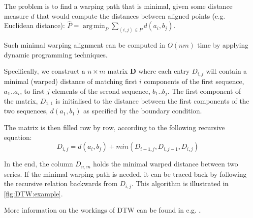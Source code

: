 \documentclass[parskip]{cs4rep}
\DeclareMathOperator*{\argmin}{arg\,min}
\begin{document}
The problem is to find a warping path that is minimal, given some distance measure $d$ that would compute the distances between aligned points (e.g. Euclidean distance): $\hat{P} = \argmin_P \sum_{(i,j) \in P} d(a_i, b_j)$.

Such minimal warping alignment can be computed in $O(nm)$ time by applying dynamic programming techniques. 

Specifically, we construct a $n \times m$ matrix $\mathbf{D}$ where each entry $D_{i,j}$ will contain a minimal (warped) distance of matching first $i$ components of the first sequence, $a_1..a_i$, to first $j$ elements of the second sequence, $b_1..b_j$. The first component of the matrix, $D_{1,1}$ is initialised to the distance between the first components of the two sequences, $d(a_1, b_1)$ as specified by the boundary condition.

The matrix is then filled row by row, according to the following recursive equation:
\begin{equation}\label{eq:dtw_equation}
D_{i,j} = d(a_i, b_j) + min(D_{i-1, j}, D_{i, j-1}, D_{i,j})
\end{equation}

In the end, the column $D_{n,m}$ holds the minimal warped distance between two series.
If the minimal warping path is needed, it can be traced back by following the recursive relation backwards from $D_{i,j}$. This algorithm is illustrated in \autoref{fig:DTW:example}. 

More information on the workings of DTW can be found in e.g. \citep{Muller:2007bo}.
\end{document}
